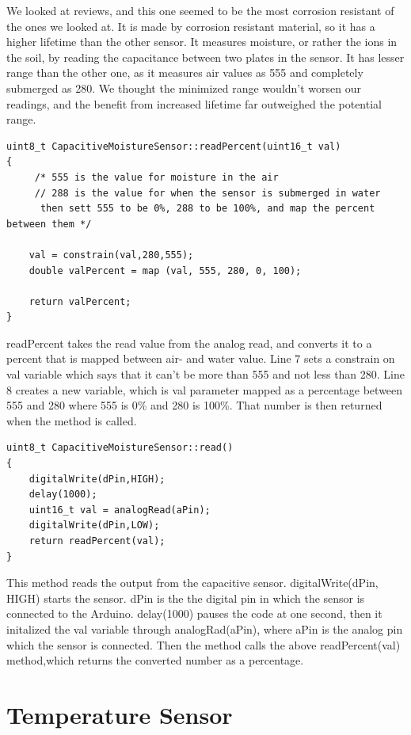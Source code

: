 \documentclass[a4paper,12pt,oneside,openright,titlepage]{book}
\begin{document}
We looked at reviews, and this one seemed to be the most corrosion resistant of the ones we looked at. It is made by corrosion resistant material, so it has a higher lifetime than the other sensor. It measures moisture, or rather the ions in the soil, by reading the capacitance between two plates in the sensor. It has lesser range than the other one, as it measures air values as 555 and completely submerged as 280. We thought the minimized range wouldn't worsen our readings, and the benefit from increased lifetime far outweighed the potential range.

\begin{lstlisting}[language=Arduino]
uint8_t CapacitiveMoistureSensor::readPercent(uint16_t val)
{
     /* 555 is the value for moisture in the air
	 // 288 is the value for when the sensor is submerged in water
	  then sett 555 to be 0%, 288 to be 100%, and map the percent between them */
	
	val = constrain(val,280,555);
	double valPercent = map (val, 555, 280, 0, 100);

	return valPercent;
}

\end{lstlisting}
readPercent takes the read value from the analog read, and converts it to a percent that is mapped between air- and water value. Line 7 sets a constrain on val variable which says that it can't be more than 555 and not less than 280. Line 8 creates a new variable, which is val parameter mapped as a percentage between 555 and 280 where 555 is 0\% and 280 is 100\%. That number is then returned when the method is called.

\begin{lstlisting}[language=Arduino]
uint8_t CapacitiveMoistureSensor::read()
{
	digitalWrite(dPin,HIGH);
	delay(1000);
    uint16_t val = analogRead(aPin);
	digitalWrite(dPin,LOW);
    return readPercent(val);
}
\end{lstlisting}

This method reads the output from the capacitive sensor. digitalWrite(dPin, HIGH) starts the sensor. dPin is the the digital pin in which the sensor is connected to the Arduino. delay(1000) pauses the code at one second, then it initalized the val variable through analogRad(aPin), where aPin is the analog pin which the sensor is connected. Then the method calls the above readPercent(val) method,which returns the converted number as a percentage.

\section{Temperature Sensor}
\end{document}
